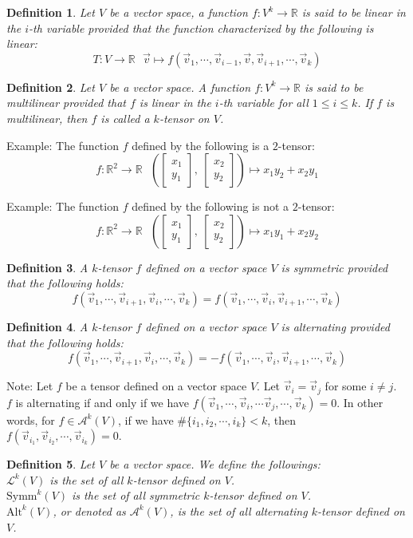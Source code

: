 \documentclass[15pt]{book}
\theoremstyle{break}
\theoremstyle{break}
\newtheorem{defn}{Definition}[corL]
\newcommand{\R}{\mathbb{R}}
\newcommand{\Lt}{\mathcal{L}}
\newcommand{\Symm}{\text{Symm}}
\newcommand{\A}{\mathcal{A}}
\newcommand{\Alt}{\text{Alt}}
\newcommand{\lr}[1]{\left(#1\right)}
\newcommand{\bmat}[1]{\begin{bmatrix} #1 \end{bmatrix}}
\newcommand{\note}{\color{red}Note: \color{black}}
\newcommand{\example}{\color{green}Example: \color{black}}
\begin{document}
\begin{defn}
Let $V$ be a vector space, a function $f:V^k\to \R$ is said to be linear in the $i$-th variable provided that the function characterized by the following is linear:
$$T:V \to \R \ \ \ \vec{v}\mapsto f(\vec{v}_1,\cdots, \vec{v}_{i-1}, \vec{v}, \vec{v}_{i+1},\cdots, \vec{v}_k)$$
\end{defn}

\begin{defn}
Let $V$ be a vector space. A function $f:V^k \to \R$ is said to be multilinear provided that $f$ is linear in the $i$-th variable for all $1 \leq i \leq k$.  If $f$ is multilinear, then $f$ is called a $k$-tensor on $V$.
\end{defn}

\example The function $f$ defined by the following is a $2$-tensor: 
$$f:\R^2 \to \R \ \ \ \lr{\bmat{x_1\\y_1},\ \bmat{x_2\\ y_2}}\mapsto x_1y_2+x_2y_1$$

\example The function $f$ defined by the following is not a $2$-tensor: 
$$f:\R^2 \to \R \ \ \ \lr{\bmat{x_1\\y_1},\ \bmat{x_2\\ y_2}}\mapsto x_1y_1+x_2y_2$$

\begin{defn}
A $k$-tensor $f$ defined on a vector space $V$ is symmetric provided that the following holds:
$$f(\vec{v}_1,\cdots, \vec{v}_{i+1}, \vec{v}_i,\cdots, \vec{v}_k) = f(\vec{v}_1,\cdots, \vec{v}_{i}, \vec{v}_{i+1},\cdots, \vec{v}_k) $$ 
\end{defn}

\begin{defn}
A $k$-tensor $f$ defined on a vector space $V$ is alternating provided that the following holds:
$$f(\vec{v}_1,\cdots, \vec{v}_{i+1}, \vec{v}_i,\cdots, \vec{v}_k) = -f(\vec{v}_1,\cdots, \vec{v}_{i}, \vec{v}_{i+1},\cdots, \vec{v}_k) $$ 
\end{defn}

\note Let $f$ be a tensor defined on a vector space $V$. Let $\vec{v}_i = \vec{v}_j$ for some $i \neq j$. \\
$f$ is alternating if and only if we have $f(\vec{v}_1,\cdots, \vec{v}_{i}, \cdots \vec{v}_{j},\cdots, \vec{v}_k) = 0$. In other words, for $f \in \A^k(V)$, if we have $\#\{ i_1,i_2,\cdots, i_k\} < k$, then $f(\vec{v}_{i_1},\vec{v}_{i_2}, \cdots, \vec{v}_{i_k}) = 0$. 

\begin{defn}
Let $V$ be a vector space. We define the followings:\\
$\Lt^k(V)$ is the set of all $k$-tensor defined on $V$.\\
$\Symm^k(V)$ is the set of all symmetric $k$-tensor defined on $V$.\\
$\Alt^k(V)$, or denoted as $\A^k(V)$, is the set of all alternating $k$-tensor defined on $V$.
\end{defn}
\end{document}
